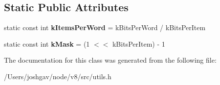 \subsection*{Static Public Attributes}
\begin{DoxyCompactItemize}
\item 
static const int {\bfseries k\+Items\+Per\+Word} = k\+Bits\+Per\+Word / k\+Bits\+Per\+Item\hypertarget{classv8_1_1internal_1_1_bit_set_computer_aa0be907049a9a722cae553a380435bd3}{}\label{classv8_1_1internal_1_1_bit_set_computer_aa0be907049a9a722cae553a380435bd3}

\item 
static const int {\bfseries k\+Mask} = (1 $<$$<$ k\+Bits\+Per\+Item) -\/ 1\hypertarget{classv8_1_1internal_1_1_bit_set_computer_aad919c363a83f30498923ca8122d780e}{}\label{classv8_1_1internal_1_1_bit_set_computer_aad919c363a83f30498923ca8122d780e}

\end{DoxyCompactItemize}


The documentation for this class was generated from the following file\+:\begin{DoxyCompactItemize}
\item 
/\+Users/joshgav/node/v8/src/utils.\+h\end{DoxyCompactItemize}

